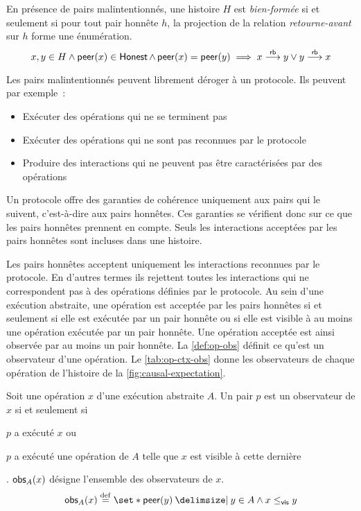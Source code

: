 \begin{definition}\label{def:wf-history-malicious}
En présence de pairs malintentionnés, une histoire $H$ est \emph{bien-formée} si et seulement si pour tout pair honnête $h$, la projection de la relation \emph{retourne-avant} sur $h$ forme une énumération.
\begin{equation*}
x, y \in H \land \operatorname{\mathsf{peer}}(x) \in \operatorname{\mathsf{Honest}} \land \operatorname{\mathsf{peer}}(x) = \operatorname{\mathsf{peer}}(y) \implies x \overset{\mathsf{rb}}{\longrightarrow} y \lor y \overset{\mathsf{rb}}{\longrightarrow} x
\end{equation*}
\end{definition}

Les pairs malintentionnés peuvent librement déroger à un protocole.
Ils peuvent par exemple~:
\begin{itemize}
    \item Exécuter des opérations qui ne se terminent pas
    \item Exécuter des opérations qui ne sont pas reconnues par le protocole
    \item Produire des interactions qui ne peuvent pas être caractérisées par des opérations
\end{itemize}
Un protocole offre des garanties de cohérence uniquement aux pairs qui le suivent, c'est-à-dire aux pairs honnêtes.
Ces garanties se vérifient donc sur ce que les pairs honnêtes prennent en compte.
Seuls les interactions acceptées par les pairs honnêtes sont incluses dans une histoire.

Les pairs honnêtes acceptent uniquement les interactions reconnues par le protocole.
En d'autres termes ils rejettent toutes les interactions qui ne correspondent pas à des opérations définies par le protocole.
Au sein d'une exécution abstraite, une opération est acceptée par les pairs honnêtes si et seulement si elle est exécutée par un pair honnête ou si elle est visible à au moins une opération exécutée par un pair honnête.
Une opération acceptée est ainsi observée par au moins un pair honnête.
La \autoref{def:op-obs} définit ce qu'est un observateur d'une opération.
Le \autoref{tab:op-ctx-obs} donne les observateurs de chaque opération de l'histoire de la \autoref{fig:causal-expectation}.

\begin{definition}[Observateurs]\label{def:op-obs}
Soit une opération $x$ d'une exécution abstraite $A$.
Un pair $p$ est un observateur de $x$ si et seulement si \begin{inlinelist}\item $p$ a exécuté $x$ ou \item $p$ a exécuté une opération de $A$ telle que $x$ est visible à cette dernière\end{inlinelist}.
$\operatorname{\mathsf{obs}}_A(x)$ désigne l'ensemble des observateurs de $x$.
\begin{equation*}
  \trm{obs}_A(x) \defeq \set*{ \trm{peer}(y) \given y \in A \land x \viseq y}
\end{equation*}
\end{definition}

